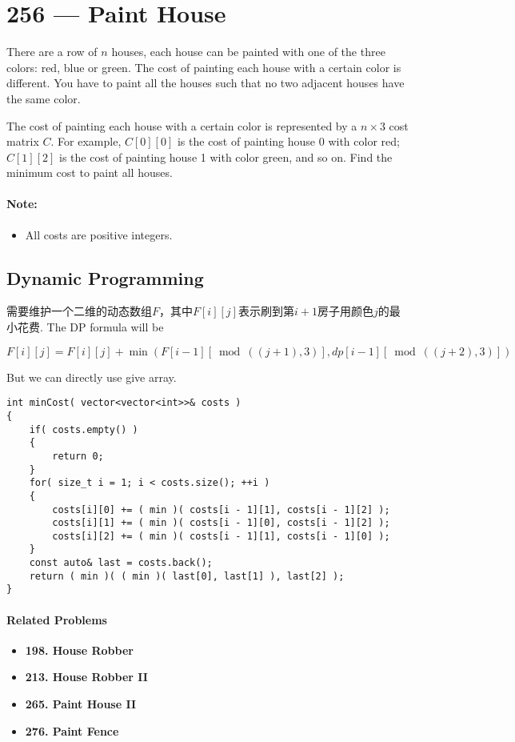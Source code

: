 \section{256 --- Paint House}
There are a row of $n$ houses, each house can be painted with one of the three colors: red, blue or green. The cost of painting each house with a certain color is different. You have to paint all the houses such that no two adjacent houses have the same color.

The cost of painting each house with a certain color is represented by a $n \times 3$ cost matrix $C$. For example, $C[0][0]$ is the cost of painting house 0 with color red; $C[1][2]$ is the cost of painting house 1 with color green, and so on. Find the minimum cost to paint all houses.
\paragraph{Note:}
\begin{itemize}
\item All costs are positive integers.
\end{itemize}
\subsection{Dynamic Programming}
需要维护一个二维的动态数组$F$，其中$F[i][j]$表示刷到第$i+1$房子用颜色$j$的最小花费. The DP formula will be

$F[i][j] = F[i][j] + \min(F[i - 1][\bmod((j + 1), 3)], dp[i - 1][\bmod((j + 2),3)])$

But we can directly use give  array.

\setcounter{lstlisting}{0}
\begin{lstlisting}[style=customc, caption={DP}]
int minCost( vector<vector<int>>& costs )
{
    if( costs.empty() )
    {
        return 0;
    }
    for( size_t i = 1; i < costs.size(); ++i )
    {
        costs[i][0] += ( min )( costs[i - 1][1], costs[i - 1][2] );
        costs[i][1] += ( min )( costs[i - 1][0], costs[i - 1][2] );
        costs[i][2] += ( min )( costs[i - 1][1], costs[i - 1][0] );
    }
    const auto& last = costs.back();
    return ( min )( ( min )( last[0], last[1] ), last[2] );
}
\end{lstlisting}


\paragraph{Related Problems}
\begin{itemize}
\item \textbf{198. House Robber}
\item \textbf{213. House Robber II}
\item \textbf{265. Paint House II}
\item \textbf{276. Paint Fence}
\end{itemize}